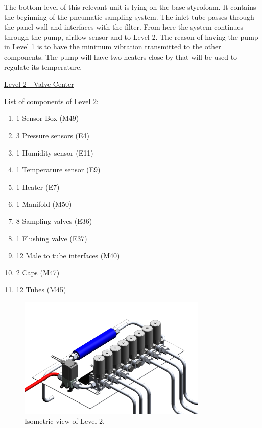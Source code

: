 \smallskip
The bottom level of this relevant unit is lying on the base styrofoam. It contains the beginning of the pneumatic sampling system. The inlet tube passes through the panel wall and interfaces with the filter. From here the system continues through the pump, airflow sensor and to Level 2.
The reason of having the pump in Level 1 is to have the minimum vibration transmitted to the other components. The pump will have two heaters close by that will be used to regulate its temperature. 


\pagebreak
\underline{Level 2 - Valve Center}


List of components of Level 2:

\begin{enumerate}[label=\Alph*.]
    \item 1 Sensor Box (M49)
    \item 3 Pressure sensors (E4)
    \item 1 Humidity sensor (E11)
    \item 1 Temperature sensor (E9)
    \item 1 Heater (E7)
    \item 1 Manifold (M50)
    \item 8 Sampling valves (E36)
    \item 1 Flushing valve (E37)
    \item 12 Male to tube interfaces (M40)
    \item 2 Caps (M47)
    \item 12 Tubes (M45)
\end{enumerate}


\begin{figure}[H]
    \centering
    \includegraphics[width=0.8\textwidth]{4-experiment-design/img/Mechanical/Level_2.png}
    \caption{Isometric view of Level 2.}
    \label{level_2}
\end{figure}

